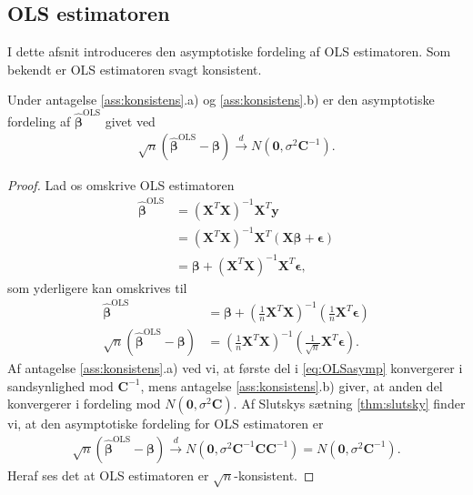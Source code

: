 \subsection{OLS estimatoren}
I dette afsnit introduceres den asymptotiske fordeling af OLS estimatoren.
Som bekendt er OLS estimatoren svagt konsistent.
\begin{thm} \label{thm:asymp_ols}
Under antagelse \ref{ass:konsistens}.a) og \ref{ass:konsistens}.b) er den asymptotiske fordeling af $\boldsymbol{\widehat{\beta}}^{\text{OLS}}$ givet ved
\begin{align*}
\sqrt{n}(\widehat{\boldsymbol{\beta}}^{\text{OLS}}-\boldsymbol{\beta}) \overset{d}{\rightarrow} N(\mathbf{0},\sigma^2 \mathbf{C}^{-1}).
\end{align*}
\end{thm}
\begin{proof}
Lad os omskrive OLS estimatoren
\begin{align*}
\widehat{\boldsymbol{\beta}}^{\text{OLS}}  &= (\textbf{X}^T\textbf{X})^{-1}\textbf{X}^T\textbf{y} \\
&= (\textbf{X}^T\textbf{X})^{-1}\textbf{X}^T (\textbf{X} \boldsymbol{\beta} + \boldsymbol{\epsilon}) \\
&= \boldsymbol{\beta} + (\textbf{X}^T\textbf{X})^{-1}\textbf{X}^T \boldsymbol{\epsilon},
\end{align*}
som yderligere kan omskrives til
\begin{align}
\widehat{\boldsymbol{\beta}}^{\text{OLS}}  &=\boldsymbol{\beta} + \left( \frac{1}{n} \mathbf{X}^T \mathbf{X} \right)^{-1} \left( \frac{1}{n} \mathbf{X}^T \boldsymbol{\epsilon} \right) \nonumber \\
\sqrt{n}(\hat{\boldsymbol{\beta}}^{\text{OLS}} -\boldsymbol{\beta})&=\left( \frac{1}{n} \mathbf{X}^T \mathbf{X} \right)^{-1} \left( \frac{1}{\sqrt{n}} \mathbf{X}^T \boldsymbol{\epsilon} \right). \label{eq:OLSasymp}
\end{align}
Af antagelse \ref{ass:konsistens}.a) ved vi, at første del i \eqref{eq:OLSasymp} konvergerer i sandsynlighed mod $\mathbf{C}^{-1}$, mens antagelse \ref{ass:konsistens}.b) giver, at anden del konvergerer i fordeling mod $N(\mathbf{0},\sigma^2 \mathbf{C})$. Af Slutskys sætning \ref{thm:slutsky} finder vi, at den asymptotiske fordeling for OLS estimatoren er
\begin{align*}
\sqrt{n}(\hat{\boldsymbol{\beta}}^{\text{OLS}}-\boldsymbol{\beta}) \overset{d}{\rightarrow} N(\mathbf{0},\sigma^2 \mathbf{C}^{-1} \mathbf{C} \mathbf{C}^{-1})=N(\mathbf{0},\sigma^2 \mathbf{C}^{-1}).
\end{align*}
Heraf ses det at OLS estimatoren er \(\sqrt{n}\)-konsistent.
\end{proof}
%
